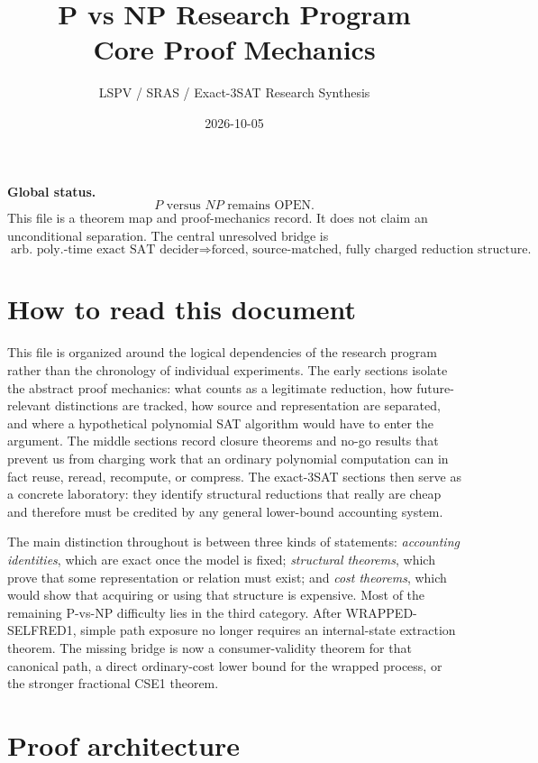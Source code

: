 \documentclass[11pt]{article}
\title{\bfseries P vs NP Research Program\\[0.2em]
\Large Core Proof Mechanics}
\author{LSPV / SRAS / Exact-3SAT Research Synthesis}
\date{2026-10-05}
\theoremstyle{plain}
\theoremstyle{definition}
\theoremstyle{remark}
\begin{document}
\maketitle

\begin{statusbox}
\textbf{Global status.}
\[
\boxed{\text{$P$ versus $NP$ remains OPEN.}}
\]
This file is a theorem map and proof-mechanics record. It does not claim an
unconditional separation. The central unresolved bridge is
\[
\boxed{
\text{arb. poly.-time exact SAT decider}
\Longrightarrow
\text{forced, source-matched, fully charged reduction structure.}
}
\]
\end{statusbox}

\tableofcontents
\bigskip

\section*{How to read this document}

This file is organized around the logical dependencies of the research
program rather than the chronology of individual experiments. The early
sections isolate the abstract proof mechanics: what counts as a legitimate
reduction, how future-relevant distinctions are tracked, how source and
representation are separated, and where a hypothetical polynomial SAT
algorithm would have to enter the argument. The middle sections record closure
theorems and no-go results that prevent us from charging work that an ordinary
polynomial computation can in fact reuse, reread, recompute, or compress. The
exact-3SAT sections then serve as a concrete laboratory: they identify
structural reductions that really are cheap and therefore must be credited by
any general lower-bound accounting system.

The main distinction throughout is between three kinds of statements:
\emph{accounting identities}, which are exact once the model is fixed;
\emph{structural theorems}, which prove that some representation or relation
must exist; and \emph{cost theorems}, which would show that acquiring or using
that structure is expensive. Most of the remaining P-vs-NP difficulty lies in
the third category.  After WRAPPED-SELFRED1, simple path exposure no longer
requires an internal-state extraction theorem.  The missing bridge is now a
consumer-validity theorem for that canonical path, a direct ordinary-cost
lower bound for the wrapped process, or the stronger fractional CSE1 theorem.

\section{Proof architecture}
\end{document}
